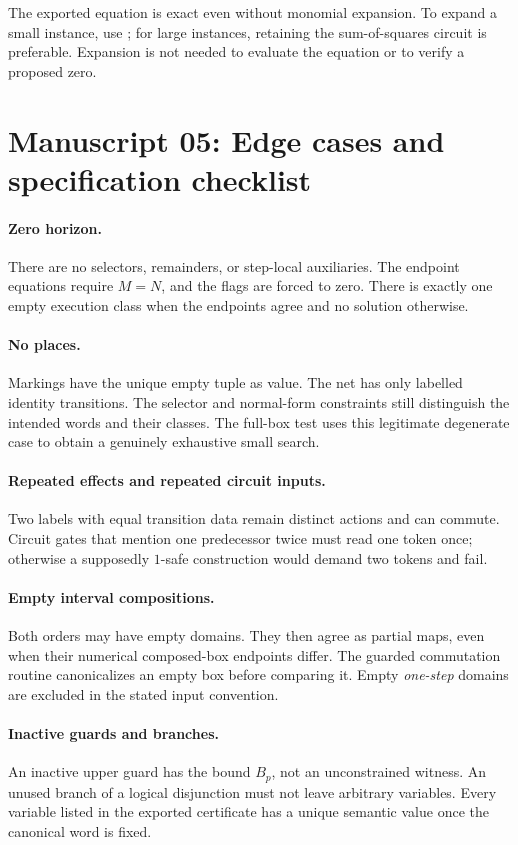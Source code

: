 \documentclass[11pt,a4paper]{article}
\theoremstyle{definition}
\theoremstyle{remark}
\newcommand{\code}[1]{\texttt{\detokenize{#1}}}
\begin{document}
The exported equation is exact even without monomial expansion. To expand a small instance, use \code{cert.expanded_polynomial()}; for large instances, retaining the sum-of-squares circuit is preferable. Expansion is not needed to evaluate the equation or to verify a proposed zero.

\section{Manuscript 05: Edge cases and specification checklist}
\label{cdc:app:edges}
\paragraph{Zero horizon.}
There are no selectors, remainders, or step-local auxiliaries. The endpoint equations require $M=N$, and the flags are forced to zero. There is exactly one empty execution class when the endpoints agree and no solution otherwise.

\paragraph{No places.}
Markings have the unique empty tuple as value. The net has only labelled identity transitions. The selector and normal-form constraints still distinguish the intended words and their classes. The full-box test uses this legitimate degenerate case to obtain a genuinely exhaustive small search.

\paragraph{Repeated effects and repeated circuit inputs.}
Two labels with equal transition data remain distinct actions and can commute. Circuit gates that mention one predecessor twice must read one token once; otherwise a supposedly $1$-safe construction would demand two tokens and fail.

\paragraph{Empty interval compositions.}
Both orders may have empty domains. They then agree as partial maps, even when their numerical composed-box endpoints differ. The guarded commutation routine canonicalizes an empty box before comparing it. Empty \emph{one-step} domains are excluded in the stated input convention.

\paragraph{Inactive guards and branches.}
An inactive upper guard has the bound $B_p$, not an unconstrained witness. An unused branch of a logical disjunction must not leave arbitrary variables. Every variable listed in the exported certificate has a unique semantic value once the canonical word is fixed.
\end{document}
